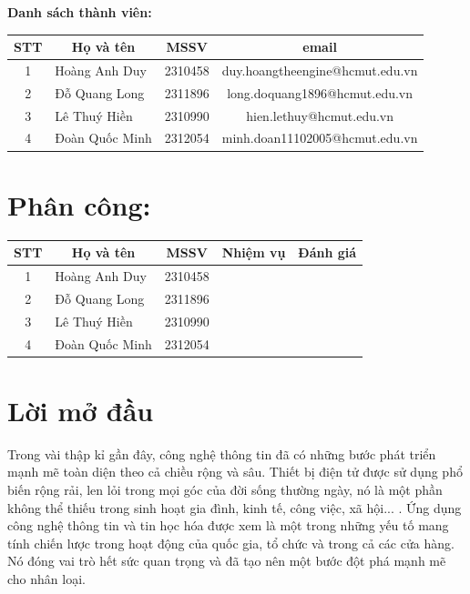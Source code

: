 \documentclass[pt = 12,a4paper]{article}
\makeatletter
\renewcommand\tableofcontents{%
  \section*{\centering\contentsname
    \@mkboth{%
      \MakeUppercase\contentsname}{\MakeUppercase\contentsname}}%
  \@starttoc{toc}%
}
\makeatother
\begin{document}
\begin{titlepage}
\fontsize{12pt}{25pt}\selectfont
{\textbf{Danh sách thành viên:}

\begin{tabular}{|c|l|l|c|} \hline 
  \multicolumn{1}{|c|}{STT} & \multicolumn{1}{c|}{Họ và tên} & \multicolumn{1}{c|}{MSSV} & \multicolumn{1}{c|}{email} \\ \hline
  1 & Hoàng Anh Duy & 2310458 & duy.hoangtheengine@hcmut.edu.vn   \\ \hline
  2 & Đỗ Quang Long & 2311896 &  long.doquang1896@hcmut.edu.vn  \\ \hline
  3 & Lê Thuý Hiền & 2310990 & hien.lethuy@hcmut.edu.vn   \\ \hline
  4 & Đoàn Quốc Minh & 2312054 & minh.doan11102005@hcmut.edu.vn     \\ \hline
\end{tabular}}
\end{titlepage}


\newpage
\footnotesize
\tableofcontents
\thispagestyle{empty}
\clearpage
\large
\newpage
\footnotesize
{}
    \vspace{-2cm}
\selectfont 

\section*{Phân công:}
\begin{tabular}{|c|l|l|c|c|}\hline
  \multicolumn{1}{|c|}{STT} & \multicolumn{1}{c|}{Họ và tên} & \multicolumn{1}{c|}{MSSV} & \multicolumn{1}{c|}{Nhiệm vụ}& Đánh giá \\ \hline
  1 & Hoàng Anh Duy & 2310458 &  &   \\ \hline
  2 & Đỗ Quang Long & 2311896 &  &  \\ \hline
  3 & Lê Thuý Hiền & 2310990 &  & \\ \hline
  4 & Đoàn Quốc Minh & 2312054 &  &  \\ \hline
\end{tabular}
\newpage
{}
\section{Lời mở đầu}
\hspace{0.4cm} Trong vài thập kỉ gần đây, công nghệ thông tin đã có những bước phát triển mạnh mẽ toàn diện theo cả chiều rộng và sâu. Thiết bị điện tử được sử dụng phổ biến rộng rải, len lỏi trong mọi góc của đời sống thường ngày, nó là một phần không thể thiếu trong sinh hoạt gia đình, kinh tế, công việc, xã hội... . Ứng dụng công nghệ thông tin và tin học hóa được xem là một trong những yếu tố mang tính chiến lược trong hoạt động của quốc gia, tổ chức và trong cả các cửa hàng. Nó đóng vai trò hết sức quan trọng và đã tạo nên một bước đột phá mạnh mẽ cho nhân loại. \\
\end{document}
